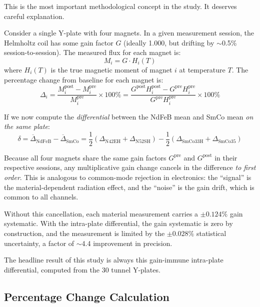 \documentclass[11pt,letterpaper]{article}
\begin{document}
This is the most important methodological concept in the study. It deserves
careful explanation.

Consider a single Y-plate with four magnets. In a given measurement session,
the Helmholtz coil has some gain factor $G$ (ideally 1.000, but drifting by
$\sim$0.5\% session-to-session). The measured flux for each magnet is:
\begin{equation}
    M_i = G \cdot H_i(T)
\end{equation}
where $H_i(T)$ is the true magnetic moment of magnet $i$ at temperature $T$.
The percentage change from baseline for each magnet is:
\begin{equation}
    \Delta_i = \frac{M_i^\mathrm{post} - M_i^\mathrm{pre}}{M_i^\mathrm{pre}} \times 100\%
    = \frac{G^\mathrm{post} H_i^\mathrm{post} - G^\mathrm{pre} H_i^\mathrm{pre}}{G^\mathrm{pre} H_i^\mathrm{pre}} \times 100\%
\end{equation}

If we now compute the \emph{differential} between the NdFeB mean and SmCo mean
\emph{on the same plate}:
\begin{equation}
    \delta = \overline{\Delta}_\mathrm{NdFeB} - \overline{\Delta}_\mathrm{SmCo}
    = \frac{1}{2}(\Delta_\mathrm{N42EH} + \Delta_\mathrm{N52SH})
    - \frac{1}{2}(\Delta_\mathrm{SmCo33H} + \Delta_\mathrm{SmCo35})
\end{equation}

Because all four magnets share the same gain factors $G^\mathrm{pre}$ and
$G^\mathrm{post}$ in their respective sessions, any multiplicative gain change
cancels in the difference \emph{to first order}. This is analogous to
common-mode rejection in electronics: the ``signal'' is the material-dependent
radiation effect, and the ``noise'' is the gain drift, which is common to all
channels.

Without this cancellation, each material
measurement carries a $\pm 0.124\%$ gain systematic. With the intra-plate
differential, the gain systematic is zero by construction, and the
measurement is limited by the $\pm 0.028\%$ statistical uncertainty, a factor
of $\sim$4.4 improvement in precision.

The headline result of this study is always this gain-immune
intra-plate differential, computed from the 30 tunnel Y-plates.

\subsection{Percentage Change Calculation}
\end{document}
